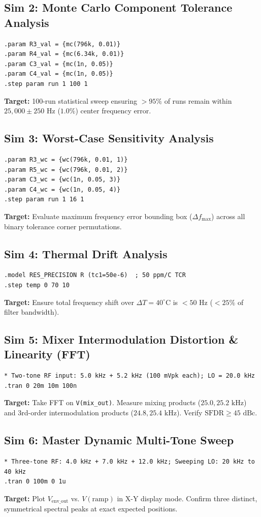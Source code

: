 \documentclass[11pt,a4paper]{article}
\begin{document}
\subsection{Sim 2: Monte Carlo Component Tolerance Analysis}
\begin{lstlisting}
.param R3_val = {mc(796k, 0.01)}
.param R4_val = {mc(6.34k, 0.01)}
.param C3_val = {mc(1n, 0.05)}
.param C4_val = {mc(1n, 0.05)}
.step param run 1 100 1
\end{lstlisting}
\textbf{Target:} 100-run statistical sweep ensuring $>95\%$ of runs remain within $25,000 \pm 250\text{ Hz}$ ($1.0\%$) center frequency error.

\subsection{Sim 3: Worst-Case Sensitivity Analysis}
\begin{lstlisting}
.param R3_wc = {wc(796k, 0.01, 1)}
.param R5_wc = {wc(796k, 0.01, 2)}
.param C3_wc = {wc(1n, 0.05, 3)}
.param C4_wc = {wc(1n, 0.05, 4)}
.step param run 1 16 1
\end{lstlisting}
\textbf{Target:} Evaluate maximum frequency error bounding box ($\Delta f_{\text{max}}$) across all binary tolerance corner permutations.

\subsection{Sim 4: Thermal Drift Analysis}
\begin{lstlisting}
.model RES_PRECISION R (tc1=50e-6)  ; 50 ppm/C TCR
.step temp 0 70 10
\end{lstlisting}
\textbf{Target:} Ensure total frequency shift over $\Delta T = 40^\circ\text{C}$ is $< 50\text{ Hz}$ ($< 25\%$ of filter bandwidth).

\subsection{Sim 5: Mixer Intermodulation Distortion \& Linearity (FFT)}
\begin{lstlisting}
* Two-tone RF input: 5.0 kHz + 5.2 kHz (100 mVpk each); LO = 20.0 kHz
.tran 0 20m 10m 100n
\end{lstlisting}
\textbf{Target:} Take FFT on \texttt{V(mix\_out)}. Measure mixing products ($25.0, 25.2\text{ kHz}$) and 3rd-order intermodulation products ($24.8, 25.4\text{ kHz}$). Verify $\text{SFDR} \ge 45\text{ dBc}$.

\subsection{Sim 6: Master Dynamic Multi-Tone Sweep}
\begin{lstlisting}
* Three-tone RF: 4.0 kHz + 7.0 kHz + 12.0 kHz; Sweeping LO: 20 kHz to 40 kHz
.tran 0 100m 0 1u
\end{lstlisting}
\textbf{Target:} Plot $V_{\text{env\_out}}$ vs. $V(\text{ramp})$ in X-Y display mode. Confirm three distinct, symmetrical spectral peaks at exact expected positions.
\end{document}

